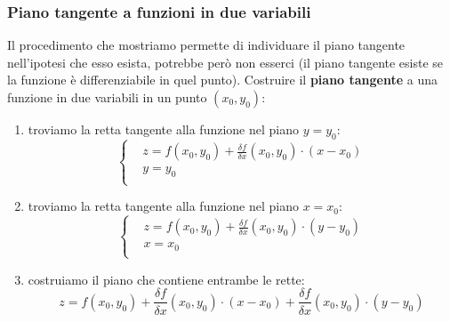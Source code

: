 \subsubsection{Piano tangente a funzioni in due variabili}
Il procedimento che mostriamo permette di individuare il piano tangente nell'ipotesi che esso esista, potrebbe però non esserci (il piano tangente esiste se la funzione è differenziabile in quel punto).\newline
\newline
Costruire il \textbf{piano tangente} a una funzione in due variabili in un punto $(x_0, y_0)$:
\begin{enumerate}
    \item troviamo la retta tangente alla funzione nel piano $y=y_0$:
    \[
        \begin{cases}
            &z = f(x_0, y_0) + \frac{\delta f}{\delta x}(x_0, y_0) \cdot (x-x_0)\\
            &y=y_0 \\
        \end{cases}
    \]
    \item troviamo la retta tangente alla funzione nel piano $x=x_0$:
    \[
        \begin{cases}
            &z = f(x_0, y_0) + \frac{\delta f}{\delta x}(x_0, y_0) \cdot (y-y_0)\\
            &x=x_0 \\
        \end{cases}
    \]
    \item costruiamo il piano che contiene entrambe le rette:
    \[
        z = f(x_0, y_0) + \frac{\delta f}{\delta x}(x_0, y_0) \cdot (x-x_0) + \frac{\delta f}{\delta x}(x_0, y_0) \cdot (y-y_0)
    \]
\end{enumerate}
